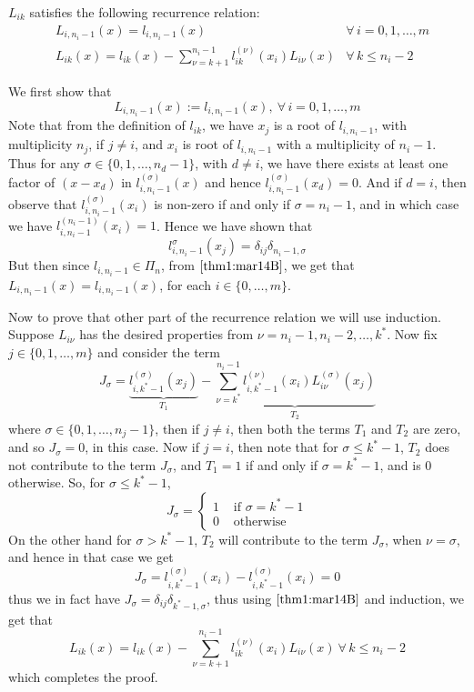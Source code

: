 \begin{thm}
    $L_{ik}$ satisfies the following recurrence relation:
    \begin{align*}
        &L_{i,n_i-1}(x) = l_{i,n_i-1}(x) &\forall \, i = 0,1,\dots,m \\
        &L_{ik}(x) = l_{ik}(x) - \sum_{\nu = k+1}^{n_i-1} l^{(\nu)}_{ik}(x_i) L_{i\nu}(x) &\forall \, k \leq n_i-2 
    \end{align*}
\end{thm}
\begin{prf}
    We first show that 
    \[
        L_{i,n_i-1}(x) := l_{i,n_i-1}(x), \ \forall \, i = 0,1,\dots,m
    \]
    Note that from the definition of $l_{ik}$, we have $x_j$ is a root of $l_{i,n_i-1}$, with multiplicity $n_j$, if $j \neq i$, and $x_i$ is root of $l_{i,n_i-1}$ with a multiplicity of $n_i-1$. Thus for any $\sigma \in \{0,1,\dots,n_d-1\}$, with $d \neq i$, we have there exists at least one factor of $(x-x_d)$ in $l_{i,n_i-1}^{(\sigma)}(x)$ and hence $l_{i,n_i-1}^{(\sigma)}(x_d) = 0$. And if $d = i$, then observe that $l_{i,n_i-1}^{(\sigma)}(x_i)$ is non-zero if and only if $\sigma = n_i-1$, and in which case we have $l_{i,n_i-1}^{(n_i-1)}(x_i)=1$. Hence we have shown that 
    \[
        l_{i,n_i-1}^{\sigma}(x_j) = \delta_{ij} \delta_{n_i-1,\sigma}  
    \]
    But then since $l_{i,n_i-1} \in \Pi_n$, from  $\ref{thm1:mar14B}$, we get that $L_{i,n_i-1}(x) = l_{i,n_i-1}(x)$, for each $i \in \{0,\dots,m\}$.

    Now to prove that other part of the recurrence relation we will use induction. Suppose $L_{i\nu}$ has the desired properties from $\nu = n_i-1, n_i-2, \dots, k^*$. Now fix $j \in \{0,1,\dots,m\}$ and consider the term
    \[
         J_{\sigma} = \underbrace{l_{i,k^*-1}^{(\sigma)}(x_j)}_{T_1} - \underbrace{\sum_{\nu=k^*}^{n_i-1}l_{i,k^*-1}^{(\nu)}(x_i) L_{i\nu}^{(\sigma)}(x_j)}_{T_2}   
    \]
    where $\sigma \in \{0,1,\dots,n_j-1\}$, then if $ j \neq i$, then both the terms $T_1$ and $T_2$ are zero, and so $J_{\sigma} = 0$, in this case. Now if $j = i$, then note that for $\sigma \leq k^*-1$, $T_2$ does not contribute to the term $J_{\sigma}$, and $T_1 = 1$ if and only if $\sigma = k^*-1$, and is $0$ otherwise. So, for $\sigma \leq k^*-1$, \[
     J_{\sigma} = \begin{cases}
         1 & \mbox{ if } \sigma = k^*-1 \\ 
         0 & \mbox{ otherwise}
     \end{cases}    
    \]
    On the other hand for $\sigma > k^*-1$, $T_2$ will contribute to the term $J_{\sigma}$, when $\nu = \sigma$, and hence in that case we get 
    \[
        J_{\sigma} = l_{i,k^*-1}^{(\sigma)}(x_i) - l_{i,k^*-1}^{(\sigma)}(x_i) = 0
    \]
    thus we in fact have $J_{\sigma} = \delta_{ij} \delta_{k^*-1,\sigma}$, thus using  $\ref{thm1:mar14B}$ and induction, we get that 
    \[
        L_{ik}(x) = l_{ik}(x) - \sum_{\nu = k+1}^{n_i-1} l^{(\nu)}_{ik}(x_i) L_{i\nu}(x)  \ \forall \, k \leq n_i-2
    \]
    which completes the proof.
\end{prf}
